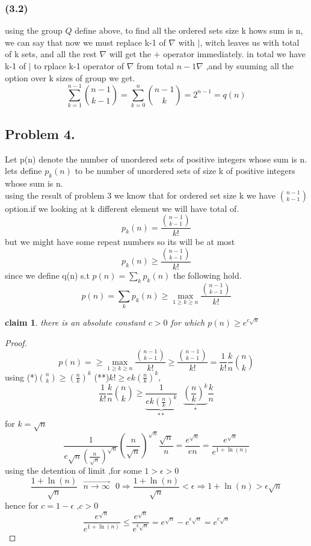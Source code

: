 \documentclass[12pt]{article}
\newtheorem*{claim*}{claim}
\begin{document}
\subsubsection*{(3.2)}
using the group  $Q$ define above, to find all  the ordered sets size k hows sum is n, we can say that now we must replace k-1 of $\nabla$ with $|$, witch leaves us with total of k sets, and all the rest $\nabla$ will get the $+$ operator immediately.
in total we have k-1 of $|$  to rplace k-1 operator of $\nabla$ from total $n-1\nabla$ ,and by suuming all the option over k sizes of group we get.
\[
\sum_{k=1}^{n-1} \binom{n-1}{k-1}=\sum_{k=0}^{n} \binom{n-1}{k}=2^{n-1}=q(n)
\]
\subsection*{Problem 4.}
 Let p(n) denote the number of unordered sets of positive integers whose sum is n. 
lets  define $p_k(n)$ to be number  of unordered sets of size k of positive integers whose sum is n.\\
using the result of problem 3 we know that for ordered set size k we have $\binom{n-1}{k-1}$ option.if we looking at k different element we will have total of.
\[
p_k(n)=\dfrac{\binom{n-1}{k-1}}{k!}
\]
but we might have some repeat numbers so its will be at most
\[
p_k(n)\geq \dfrac{\binom{n-1}{k-1}}{k!}
\]
since we define q(n) s.t $p(n)=\sum_k p_k(n)$ the following hold.
\[
p(n)=\sum_k p_k(n)\geq 
{\max}_{1 \geq k \geq n}  \dfrac{\binom{n-1}{k-1}}{k!}
\]

\begin{claim*}
there is an absolute constant  $c>0$ for which $p(n) \geq e^{c\sqrt{n}}$
\end{claim*}
\begin{proof}
\[
p(n)=\geq 
{\max}_{1 \geq k \geq n}  \dfrac{\binom{n-1}{k-1}}{k!}
\geq \dfrac{\binom{n-1}{k-1}}{k!}
=\frac{1}{k!}\frac{k}{n}\binom{n}{k}
\]
using (*)$\binom{n}{k} \geq (\frac{n}{k})^k$ (**)$k!\geq  ek(\frac{n}{k})^k$, 
\[
\frac{1}{k!}\frac{k}{n}\binom{n}{k}
\geq \underbrace{\frac{1}{ek(\frac{n}{k})^k}}_{**}\text{  }
\underbrace{(\frac{n}{k})^k}_{*}
\frac{k}{n}
\]
for $k=\sqrt{n}$
\[
\frac{1}{e\sqrt{n}(\frac{n}{\sqrt{n}})^{\sqrt{n}}}
(\frac{n}{\sqrt{n}})^{\sqrt{n}}
\frac{\sqrt{n}}{n}=\frac{e^{\sqrt{n}}}{en}=\frac{e^{\sqrt{n}}}{e^{1+ \ln (n)}}
\]
using the detention of limit ,for some $1> \epsilon >0$
\[
\frac{1+\ln (n)}{\sqrt{n}}\text{  }\overrightarrow{n\rightarrow \infty}
\text{  }0\Rightarrow \frac{1+\ln (n)}{\sqrt{n}} < \epsilon \Rightarrow 1+\ln (n) > \epsilon \sqrt{n} \]
hence for $c=1-\epsilon $ ,$c>0$
\[
\frac{e^{\sqrt{n}}}{e^{1+ \ln (n)}}\leq \frac{e^{\sqrt{n}}}{e^{\epsilon \sqrt{n}}}=e^{\sqrt{n}}-e^{\epsilon \sqrt{n}}=e^{c\sqrt{n}}
\]
\end{proof}
\end{document}
